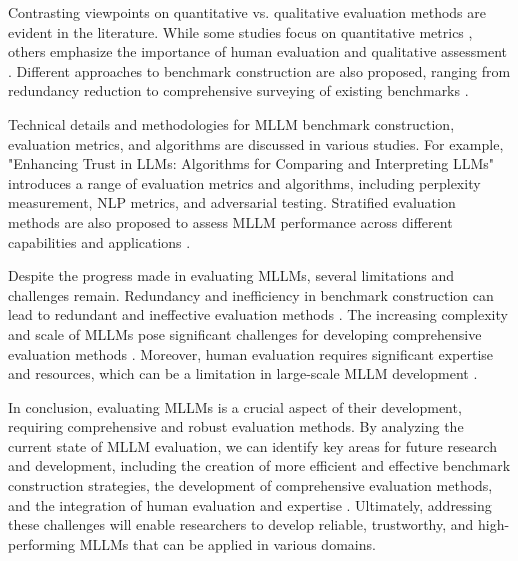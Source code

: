 \documentclass[conference]{IEEEtran}
\begin{document}
Contrasting viewpoints on quantitative vs. qualitative evaluation methods are evident in the literature. While some studies focus on quantitative metrics \cite{b4}, others emphasize the importance of human evaluation and qualitative assessment \cite{b8}. Different approaches to benchmark construction are also proposed, ranging from redundancy reduction to comprehensive surveying of existing benchmarks \cite{b3} \cite{b5}.

Technical details and methodologies for MLLM benchmark construction, evaluation metrics, and algorithms are discussed in various studies. For example, "Enhancing Trust in LLMs: Algorithms for Comparing and Interpreting LLMs" \cite{b7} introduces a range of evaluation metrics and algorithms, including perplexity measurement, NLP metrics, and adversarial testing. Stratified evaluation methods are also proposed to assess MLLM performance across different capabilities and applications \cite{b6}.

Despite the progress made in evaluating MLLMs, several limitations and challenges remain. Redundancy and inefficiency in benchmark construction can lead to redundant and ineffective evaluation methods \cite{b3}. The increasing complexity and scale of MLLMs pose significant challenges for developing comprehensive evaluation methods \cite{b2}. Moreover, human evaluation requires significant expertise and resources, which can be a limitation in large-scale MLLM development \cite{b8}.

In conclusion, evaluating MLLMs is a crucial aspect of their development, requiring comprehensive and robust evaluation methods. By analyzing the current state of MLLM evaluation, we can identify key areas for future research and development, including the creation of more efficient and effective benchmark construction strategies, the development of comprehensive evaluation methods, and the integration of human evaluation and expertise \cite{b1} \cite{b7}. Ultimately, addressing these challenges will enable researchers to develop reliable, trustworthy, and high-performing MLLMs that can be applied in various domains.
\end{document}

